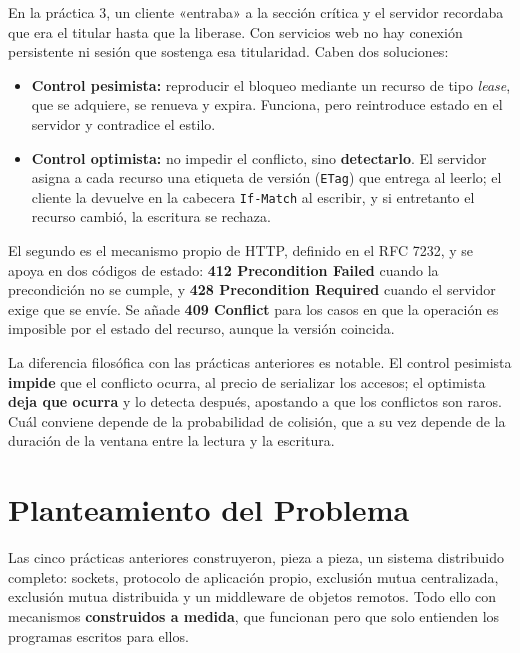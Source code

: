 \documentclass[12pt]{article}
\begin{document}
En la práctica 3, un cliente «entraba» a la sección crítica y el servidor recordaba que era el titular hasta que la liberase. Con servicios web no hay conexión persistente ni sesión que sostenga esa titularidad. Caben dos soluciones:

\begin{itemize}[itemsep=3pt]
    \item \textbf{Control pesimista:} reproducir el bloqueo mediante un recurso de tipo \textit{lease}, que se adquiere, se renueva y expira. Funciona, pero reintroduce estado en el servidor y contradice el estilo.
    \item \textbf{Control optimista:} no impedir el conflicto, sino \textbf{detectarlo}. El servidor asigna a cada recurso una etiqueta de versión (\texttt{ETag}) que entrega al leerlo; el cliente la devuelve en la cabecera \texttt{If-Match} al escribir, y si entretanto el recurso cambió, la escritura se rechaza.
\end{itemize}

El segundo es el mecanismo propio de HTTP, definido en el RFC 7232, y se apoya en dos códigos de estado: \textbf{412 Precondition Failed} cuando la precondición no se cumple, y \textbf{428 Precondition Required} cuando el servidor exige que se envíe. Se añade \textbf{409 Conflict} para los casos en que la operación es imposible por el estado del recurso, aunque la versión coincida.

La diferencia filosófica con las prácticas anteriores es notable. El control pesimista \textbf{impide} que el conflicto ocurra, al precio de serializar los accesos; el optimista \textbf{deja que ocurra} y lo detecta después, apostando a que los conflictos son raros. Cuál conviene depende de la probabilidad de colisión, que a su vez depende de la duración de la ventana entre la lectura y la escritura.

\section{Planteamiento del Problema}

Las cinco prácticas anteriores construyeron, pieza a pieza, un sistema distribuido completo: sockets, protocolo de aplicación propio, exclusión mutua centralizada, exclusión mutua distribuida y un middleware de objetos remotos. Todo ello con mecanismos \textbf{construidos a medida}, que funcionan pero que solo entienden los programas escritos para ellos.
\end{document}
